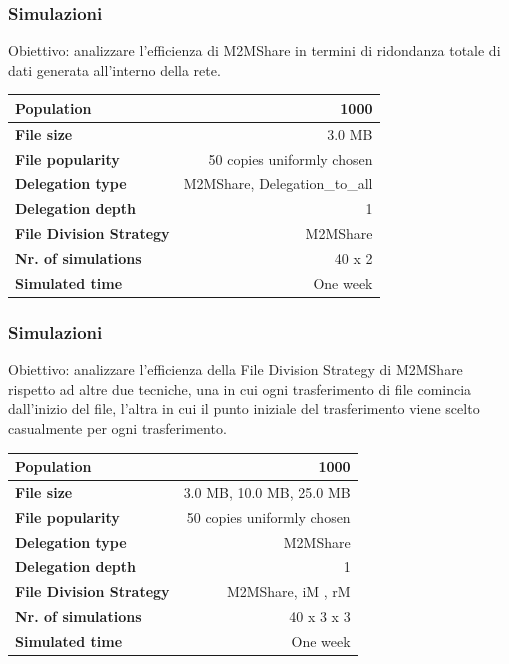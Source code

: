 \documentclass{beamer}
\begin{document}
\begin{frame}
\frametitle{Simulazioni}
Obiettivo: analizzare l'efficienza di M2MShare in termini di ridondanza totale di dati generata all'interno della rete.
\small
\begin{table}[h]
\begin{center}
\begin{tabular}{|l|r|}
\hline
\bfseries Population & 1000 \\
\hline
\bfseries File size & 3.0 MB \\
\hline
\bfseries File popularity & 50 copies uniformly chosen \\
\hline
\bfseries Delegation type & M2MShare, Delegation\_to\_all \\
\hline
\bfseries Delegation depth & 1 \\
\hline
\bfseries File Division Strategy & M2MShare \\
\hline
\bfseries Nr. of simulations & 40 x 2\\
\hline
\bfseries Simulated time & One week \\
\hline
\end{tabular}
\end{center}
\end{table}
\normalsize
\end{frame}

\begin{frame}
\frametitle{Simulazioni}
Obiettivo: analizzare l'efficienza della File Division Strategy di M2MShare rispetto ad altre due tecniche, una in cui ogni trasferimento di file comincia dall'inizio del file, l'altra in cui il punto iniziale del trasferimento viene scelto casualmente per ogni trasferimento.
\small
\begin{table}[h]
\begin{center}
\begin{tabular}{|l|r|}
\hline
\bfseries Population & 1000 \\
\hline
\bfseries File size & 3.0 MB, 10.0 MB, 25.0 MB \\
\hline
\bfseries File popularity & 50 copies uniformly chosen \\
\hline
\bfseries Delegation type & M2MShare \\
\hline
\bfseries Delegation depth & 1 \\
\hline
\bfseries File Division Strategy & M2MShare, iM , rM \\
\hline
\bfseries Nr. of simulations & 40 x 3 x 3\\
\hline
\bfseries Simulated time & One week \\
\hline
\end{tabular}
\end{center}
\end{table}
\normalsize
\end{frame}
\end{document}
